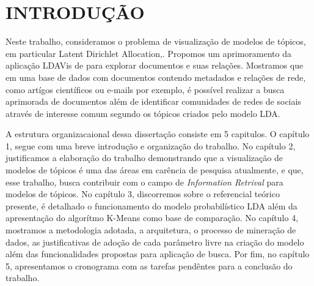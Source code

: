 \documentclass[12pt,a4paper]{article}
\begin{document}
\newpage
\pagestyle{plain}
\renewcommand{\baselinestretch}{1.5}
\normalsize
\section{INTRODUÇÃO}
 Neste trabalho, consideramos o problema de visualização de modelos de tópicos, em particular Latent Dirichlet Allocation,\cite{blei2003latent}.
 Propomos um aprimoramento da aplicação LDAVis de  para explorar documentos e suas relações. Mostramos que em uma base de dados
 com documentos contendo metadados e relações de rede, como artígos científicos ou e-mails por exemplo, é possível realizar a busca aprimorada de documentos além de identificar
 comunidades de redes de sociais através de interesse comum segundo os tópicos criados pelo modelo LDA.

 A estrutura organizacaional dessa dissertação consiste em 5 capitulos. O capítulo 1, segue com uma breve introdução e organização do trabalho. No capítulo 2, justificamos a elaboração do trabalho demonstrando
  que a visualização de modelos de tópicos é uma das áreas em carência de pesquisa atualmente, e que, esse trabalho, busca contribuir com o campo de \textit{Information Retrival} para modelos de tópicos.
  No capítulo 3, discorremos sobre o referencial teórico presente, é detalhado o funcionamento do modelo probabilístico LDA além da apresentação do algorítmo K-Means como base de comparação.
  No capítulo 4, mostramos a metodologia adotada, a arquitetura, o processo de mineração de dados, as justificativas de adoção de cada parâmetro livre na criação do modelo além das funcionalidades propostas para
  aplicação de busca. Por fim, no capítulo 5, apresentamos o cronograma com as tarefas pendêntes para a conclusão do trabalho.


\end{document}
